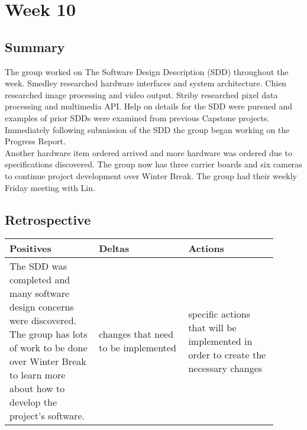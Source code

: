\documentclass[letterpaper,10pt,serif,draftclsnofoot,onecolumn,compsoc,titlepage]{IEEEtran}
\begin{document}
\section{Week 10}

\subsection{Summary}

The group worked on The Software Design Description (SDD) throughout the week. Smedley 
researched hardware interfaces and system architecture. Chien researched image 
processing and video output. Striby researched pixel data processing and multimedia 
API. Help on details for the SDD were pursued and examples of prior SDDs were examined 
from previous Capstone projects. Immediately following submission of the SDD the 
group began working on the Progress Report. \\

Another hardware item ordered arrived and more hardware was ordered due to 
specifications discovered. The group now has three carrier boards and six cameras to 
continue project development over Winter Break. The group had their weekly Friday 
meeting with Lin.\\

\subsection{Retrospective}

\begin{tabular}{|p{0.3\linewidth}|p{0.3\linewidth}|p{0.3\linewidth}|}
   \hline
   \textbf{Positives} & \textbf{Deltas} & \textbf{Actions}\\ 
   \hline
   The SDD was completed and many software design concerns were discovered. The group 
   has lots of work to be done over Winter Break to learn more about how to develop 
   the project's software.  
   & 
   changes that need to be implemented 
   & 
   specific actions that will be implemented in order to create the necessary 
   changes \\
   \hline
\end{tabular}


\nocite{*}
\end{document}
